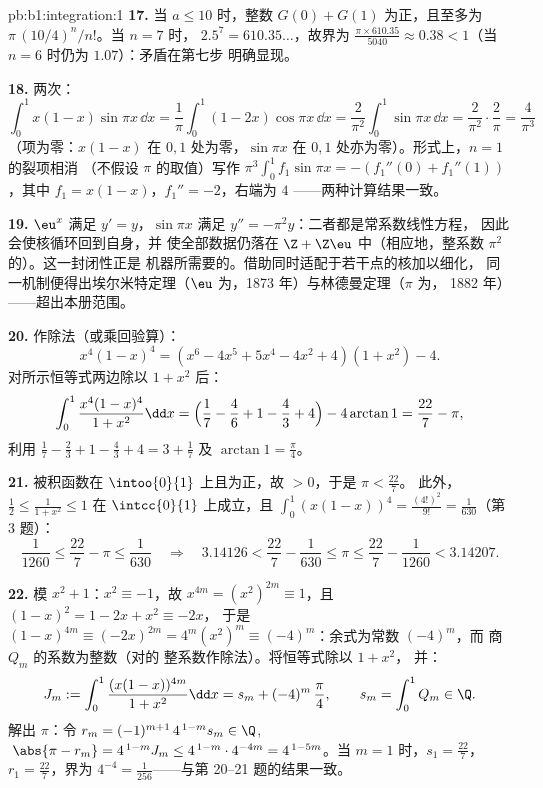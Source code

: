 \begin{solution}{pb:b1:integration:1}
\textbf{17.} 当 $a \leq 10$ 时，整数 $G(0) + G(1)$
为正，且至多为 $\pi\,(10/4)^n/n!$。当 $n = 7$ 时，
$2.5^7 = 610.35\dots$，故界为 $\frac{\pi \times
610.35}{5040} \approx 0.38 < 1$（当 $n = 6$ 时仍为
$1.07$）：矛盾在第七步
明确显现。

\textbf{18.} 两次：
\[
\int_0^1 x(1-x)\sin\pi x\,\dd x
= \frac1\pi\int_0^1 (1 - 2x)\cos\pi x\,\dd x
= \frac{2}{\pi^2}\int_0^1 \sin\pi x\,\dd x
= \frac{2}{\pi^2}\cdot\frac{2}{\pi} = \frac{4}{\pi^3}
\]
（项为零：$x(1-x)$ 在 $0, 1$ 处为零，$\sin\pi x$
在 $0, 1$ 处亦为零）。形式上，$n = 1$ 的裂项相消
（不假设 $\pi$ 的取值）写作 $\pi^3\int_0^1 f_1\sin\pi x = -(f_1''(0) +
f_1''(1))$，其中 $f_1 = x(1 - x)$，$f_1'' = -2$，右端为 $4$
——两种计算结果一致。

\textbf{19.} $\eu^x$ 满足 $y' = y$，$\sin\pi x$ 满足
$y'' = -\pi^2 y$：二者都是常系数线性方程，
因此会使核循环回到自身，并
使全部数据仍落在 $\Z + \Z\eu$ 中（相应地，整系数
$\pi^2$ 的）。这一封闭性正是
机器所需要的。借助同时适配于若干点的核加以细化，
同一机制便得出埃尔米特定理（$\eu$
为，1873 年）与林德曼定理（$\pi$ 为，
1882 年）——超出本册范围。

\textbf{20.} 作除法（或乘回验算）：
\[
x^4(1-x)^4 = (x^6 - 4x^5 + 5x^4 - 4x^2 + 4)(1 + x^2) - 4 .
\]
对所示恒等式两边除以 $1 + x^2$ 后：
\[
\int_0^1 \frac{x^4(1-x)^4}{1+x^2}\dd x
= \Bigl(\frac17 - \frac46 + 1 - \frac43 + 4\Bigr)
- 4\arctan 1
= \frac{22}{7} - \pi ,
\]
利用 $\frac17 - \frac23 + 1 - \frac43 + 4 = 3 + \frac17$ 及
$\arctan 1 = \frac\pi4$。

\textbf{21.} 被积函数在
$\intoo{0}{1}$ 上且为正，故 $> 0$，于是 $\pi < \frac{22}{7}$。
此外，$\frac12 \leq \frac{1}{1+x^2} \leq 1$ 在
$\intcc{0}{1}$ 上成立，且 $\int_0^1 (x(1-x))^4 = \frac{(4!)^2}{9!} =
\frac{1}{630}$（第 3 题）：
\[
\frac{1}{1260} \leq \frac{22}{7} - \pi \leq \frac{1}{630}
\quad\Longrightarrow\quad
3.14126 < \frac{22}{7} - \frac{1}{630} \leq \pi \leq
\frac{22}{7} - \frac{1}{1260} < 3.14207 .
\]

\textbf{22.} 模 $x^2 + 1$：$x^2 \equiv -1$，故 $x^{4m} =
(x^2)^{2m} \equiv 1$，且 $(1 - x)^2 = 1 - 2x + x^2 \equiv -2x$，
于是 $(1-x)^{4m} \equiv (-2x)^{2m} = 4^m (x^2)^m \equiv
(-4)^m$：余式为常数 $(-4)^m$，而
商 $Q_m$ 的系数为整数（对的
整系数作除法）。将恒等式除以 $1 + x^2$，
并：
\[
J_m := \int_0^1 \frac{(x(1-x))^{4m}}{1+x^2}\dd x
= s_m + (-4)^m\,\frac{\pi}{4},
\qquad s_m = \int_0^1 Q_m \in \Q .
\]
解出 $\pi$：令 $r_m = (-1)^{m+1}\,4^{\,1-m} s_m \in
\Q$, $\;\abs{\pi - r_m} = 4^{\,1-m} J_m \leq
4^{\,1-m}\cdot4^{-4m} = 4^{\,1-5m}$。当 $m = 1$ 时，$s_1 =
\frac{22}{7}$，$r_1 = \frac{22}{7}$，界为 $4^{-4} =
\frac{1}{256}$——与第 20--21 题的结果一致。


\end{solution}
